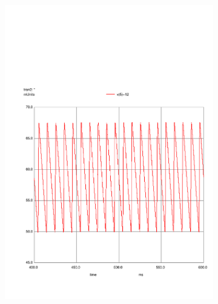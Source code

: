 \begin{figure}[h]
    \centering
    \begin{subfigure}{0.23\textwidth}
        \includegraphics[width=1.5\columnwidth, clip]{../sim/vout.pdf}
        \label{fig:PStime}
    \end{subfigure}
    \begin{subfigure}{0.23\textwidth}

\end{subfigure}
\end{figure}
